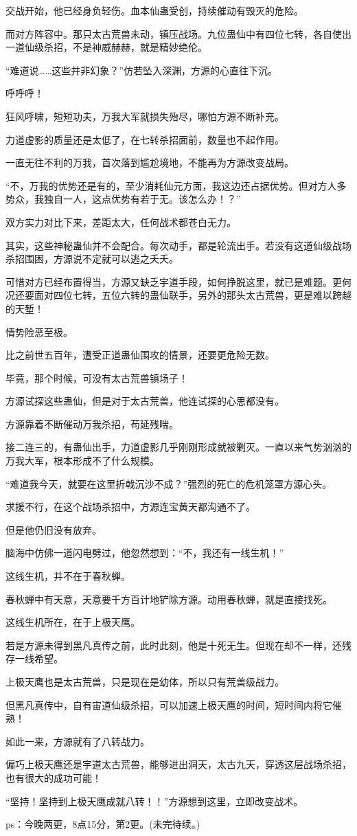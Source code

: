 \begin{this_body}
交战开始，他已经身负轻伤。血本仙蛊受创，持续催动有毁灭的危险。

而对方阵容中。那只太古荒兽未动，镇压战场。九位蛊仙中有四位七转，各自使出一道仙级杀招，不是神威赫赫，就是精妙绝伦。

“难道说……这些并非幻象？”仿若坠入深渊，方源的心直往下沉。

呼呼呼！

狂风呼啸，短短功夫，万我大军就损失殆尽，哪怕方源不断补充。

力道虚影的质量还是太低了，在七转杀招面前，数量也不起作用。

一直无往不利的万我，首次落到尴尬境地，不能再为方源改变战局。

“不，万我的优势还是有的，至少消耗仙元方面，我这边还占据优势。但对方人多势众，我独自一人，这点优势有若于无。该怎么办！？”

双方实力对比下来，差距太大，任何战术都苍白无力。

其实，这些神秘蛊仙并不会配合。每次动手，都是轮流出手。若没有这道仙级战场杀招围困，方源说不定就可以逃之夭夭。

可惜对方已经布置得当，方源又缺乏宇道手段，如何挣脱这里，就已是难题。更何况还要面对四位七转，五位六转的蛊仙联手，另外的那头太古荒兽，更是难以跨越的天堑！

情势险恶至极。

比之前世五百年，遭受正道蛊仙围攻的情景，还要更危险无数。

毕竟，那个时候，可没有太古荒兽镇场子！

方源试探这些蛊仙，但是对于太古荒兽，他连试探的心思都没有。

方源靠着不断催动万我杀招，苟延残喘。

接二连三的，有蛊仙出手，力道虚影几乎刚刚形成就被剿灭。一直以来气势汹汹的万我大军，根本形成不了什么规模。

“难道我今天，就要在这里折戟沉沙不成？”强烈的死亡的危机笼罩方源心头。

求援不行，在这个战场杀招中，方源连宝黄天都沟通不了。

但是他仍旧没有放弃。

脑海中仿佛一道闪电劈过，他忽然想到：“不，我还有一线生机！”

这线生机，并不在于春秋蝉。

春秋蝉中有天意，天意要千方百计地铲除方源。动用春秋蝉，就是直接找死。

这线生机所在，在于上极天鹰。

若是方源未得到黑凡真传之前，此时此刻，他是十死无生。但现在却不一样，还残存一线希望。

上极天鹰也是太古荒兽，只是现在是幼体，所以只有荒兽级战力。

但黑凡真传中，自有宙道仙级杀招，可以加速上极天鹰的时间，短时间内将它催熟！

如此一来，方源就有了八转战力。

偏巧上极天鹰还是宇道太古荒兽，能够进出洞天，太古九天，穿透这层战场杀招，也有很大的成功可能！

“坚持！坚持到上极天鹰成就八转！！”方源想到这里，立即改变战术。

ps：今晚两更，8点15分，第2更。(未完待续。)

\end{this_body}

